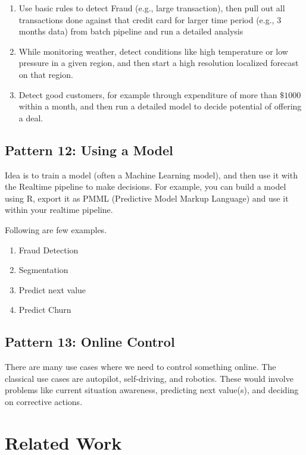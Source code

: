 \documentclass{sig-alternate}
\begin{document}
\begin{enumerate}
\item Use basic rules to detect Fraud (e.g., large transaction), then pull out all transactions done against that credit card for larger time period (e.g., 3 months data) from batch pipeline and run a detailed analysis 
\item While monitoring weather, detect conditions like high temperature or low pressure in a given region, and then start a high resolution localized forecast on that region. 
\item Detect good customers, for example through expenditure of more than $\$1000$ within a month, and then run a detailed model to decide potential of offering a deal. 
\end{enumerate}

\subsection{Pattern 12: Using a Model} 
Idea is to train a model (often a Machine Learning model), and then use it with the Realtime pipeline to make decisions. For example, you can build a model using R, export it as PMML (Predictive Model Markup Language) and use it within your realtime pipeline. 

Following are few examples.
\begin{enumerate}
\item Fraud Detection
\item Segmentation 
\item Predict next value 
\item Predict Churn 
\end{enumerate}


\subsection{Pattern 13: Online Control} 
There are many use cases where we need to control something online. The classical use cases are autopilot, self-driving, and robotics. These would involve problems like current situation awareness, predicting next value(s), and deciding on corrective actions. 


\section{Related Work}
\end{document}
